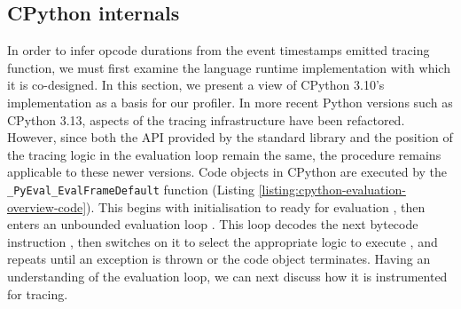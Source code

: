 \subsection{CPython internals}
\label{ssec:profiling-bytecode-cpython-internals}

In order to infer opcode durations from the event timestamps emitted tracing function, we must first examine the language runtime implementation with which it is co-designed. In this section, we present a view of CPython 3.10's implementation as a basis for our profiler.
In more recent Python versions such as CPython 3.13, aspects of the tracing infrastructure have been refactored. However, since both the API provided by the standard library and the position of the tracing logic in the evaluation loop remain the same, the procedure remains applicable to these newer versions.
Code objects in CPython are executed by the \texttt{\_PyEval\_EvalFrameDefault} function (Listing \ref{listing:cpython-evaluation-overview-code}). This begins with initialisation to ready for evaluation , then enters an unbounded evaluation loop . This loop decodes the next bytecode instruction , then switches on it to select the appropriate logic to execute , and repeats until an exception is thrown or the code object terminates.
Having an understanding of the evaluation loop, we can next discuss how it is instrumented for tracing.

